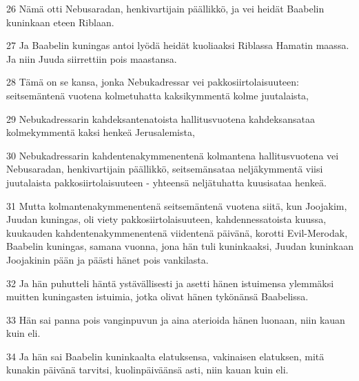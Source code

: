 \par 26 Nämä otti Nebusaradan, henkivartijain päällikkö, ja vei heidät Baabelin kuninkaan eteen Riblaan.
\par 27 Ja Baabelin kuningas antoi lyödä heidät kuoliaaksi Riblassa Hamatin maassa. Ja niin Juuda siirrettiin pois maastansa.
\par 28 Tämä on se kansa, jonka Nebukadressar vei pakkosiirtolaisuuteen: seitsemäntenä vuotena kolmetuhatta kaksikymmentä kolme juutalaista,
\par 29 Nebukadressarin kahdeksantenatoista hallitusvuotena kahdeksansataa kolmekymmentä kaksi henkeä Jerusalemista,
\par 30 Nebukadressarin kahdentenakymmenentenä kolmantena hallitusvuotena vei Nebusaradan, henkivartijain päällikkö, seitsemänsataa neljäkymmentä viisi juutalaista pakkosiirtolaisuuteen - yhteensä neljätuhatta kuusisataa henkeä.
\par 31 Mutta kolmantenakymmenentenä seitsemäntenä vuotena siitä, kun Joojakim, Juudan kuningas, oli viety pakkosiirtolaisuuteen, kahdennessatoista kuussa, kuukauden kahdentenakymmenentenä viidentenä päivänä, korotti Evil-Merodak, Baabelin kuningas, samana vuonna, jona hän tuli kuninkaaksi, Juudan kuninkaan Joojakinin pään ja päästi hänet pois vankilasta.
\par 32 Ja hän puhutteli häntä ystävällisesti ja asetti hänen istuimensa ylemmäksi muitten kuningasten istuimia, jotka olivat hänen tykönänsä Baabelissa.
\par 33 Hän sai panna pois vanginpuvun ja aina aterioida hänen luonaan, niin kauan kuin eli.
\par 34 Ja hän sai Baabelin kuninkaalta elatuksensa, vakinaisen elatuksen, mitä kunakin päivänä tarvitsi, kuolinpäiväänsä asti, niin kauan kuin eli.


